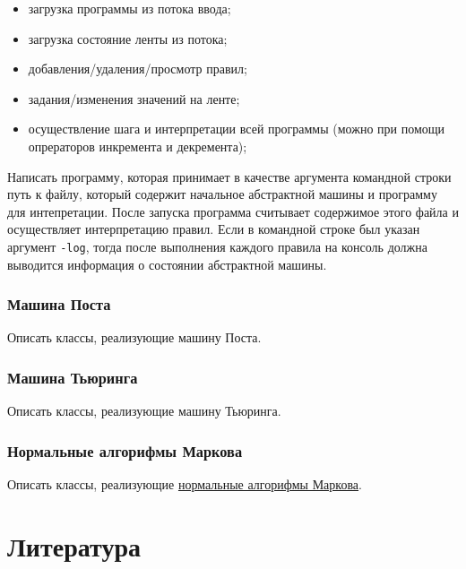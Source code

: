 \documentclass[a4paper,12pt]{article}
\begin{document}
\begin{itemize}
\item загрузка программы из потока ввода;
\item загрузка состояние ленты из потока;
\item добавления/удаления/просмотр правил;
\item задания/изменения значений на ленте;
\item осуществление шага и интерпретации всей программы (можно при
  помощи опрераторов инкремента и декремента);
\end{itemize}

Написать программу, которая принимает в качестве аргумента командной
строки путь к файлу, который содержит начальное абстрактной машины и
программу для интепретации. После запуска программа считывает
содержимое этого файла и осуществляет интерпретацию правил. Если в
командной строке был указан аргумент \verb|-log|, тогда после
выполнения каждого правила на консоль должна выводится информация о
состоянии абстрактной машины.

\subsubsection{Машина Поста}

Описать классы, реализующие машину Поста.

\subsubsection{Машина Тьюринга}

Описать классы, реализующие машину Тьюринга.

\subsubsection{Нормальные алгорифмы Маркова}

Описать классы, реализующие
\href{http://ru.wikipedia.org/wiki/%D0%9D%D0%BE%D1%80%D0%BC%D0%B0%D0%BB%D1%8C%D0%BD%D1%8B%D0%B9_%D0%B0%D0%BB%D0%B3%D0%BE%D1%80%D0%B8%D1%82%D0%BCe_%D0%9C%D0%B0%D1%80%D0%BA%D0%BE%D0%B2%D0%B0}{нормальные алгорифмы Маркова}.

\section{Литература}
\label{sec:Literature}
\end{document}
